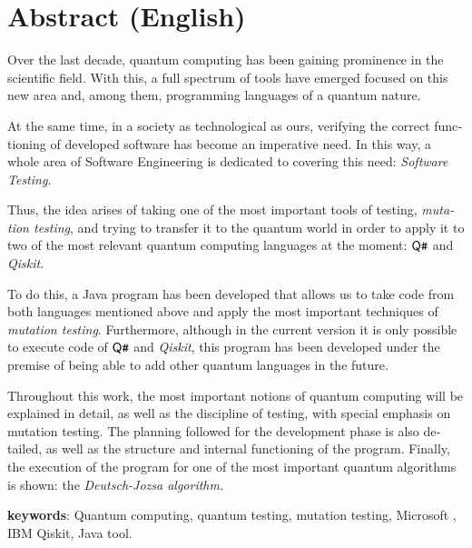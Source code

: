 \section*{Abstract (English)}
\begin{otherlanguage}{british}
Over the last decade, quantum computing has been gaining prominence in the scientific field. With this, a full spectrum of tools have emerged focused on this new area and, among them, programming languages of a quantum nature.

At the same time, in a society as technological as ours, verifying the correct functioning of developed software has become an imperative need. In this way, a whole area of Software Engineering is dedicated to covering this need: \emph{Software Testing}.

Thus, the idea arises of taking one of the most important tools of testing, \textit{mutation testing}, and trying to transfer it to the quantum world in order to apply it to two of the most relevant quantum computing languages at the moment: $\textsf{Q}\texttt{\#}$ and \textit{Qiskit}.

To do this, a Java program has been developed that allows us to take code from both languages mentioned above and apply the most important techniques of \textit{mutation testing}. Furthermore, although in the current version it is only possible to execute code of $\textsf{Q}\texttt{\#}$ and \textit{Qiskit}, this program has been developed under the premise of being able to add other quantum languages in the future.

Throughout this work, the most important notions of quantum computing will be explained in detail, as well as the discipline of testing, with special emphasis on mutation testing. The planning followed for the development phase is also detailed, as well as the structure and internal functioning of the program. Finally, the execution of the program for one of the most important quantum algorithms is shown: the \textit{Deutsch-Jozsa algorithm.}
\end{otherlanguage}

\textbf{keywords}: Quantum computing, quantum testing, mutation testing, Microsoft \qsh, IBM Qiskit, Java tool.

